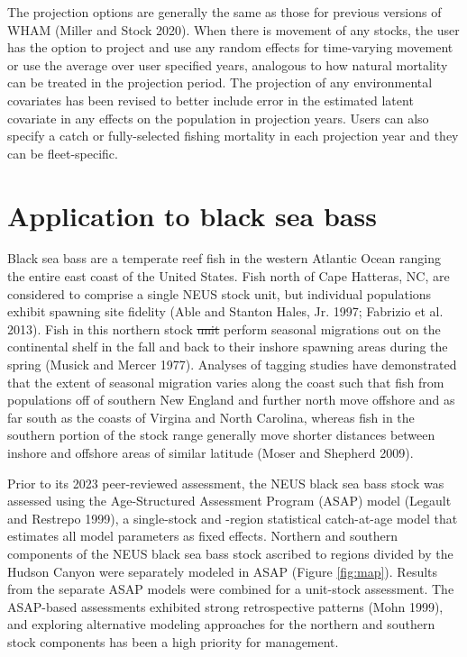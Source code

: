 \documentclass[
]{article}
\makeatletter
\providecommand{\DIFaddtex}[1]{{\protect\color{blue}\uwave{#1}}} %
\providecommand{\DIFdeltex}[1]{{\protect\color{red}\sout{#1}}} %
\providecommand{\DIFaddbegin}{} %
\providecommand{\DIFaddend}{} %
\providecommand{\DIFdelbegin}{} %
\providecommand{\DIFdelend}{} %
\providecommand{\DIFadd}[1]{\texorpdfstring{\DIFaddtex{#1}}{#1}} %
\providecommand{\DIFdel}[1]{\texorpdfstring{\DIFdeltex{#1}}{}} %
\newcommand{\DIFscaledelfig}{0.5}
\newlength{\DIFdelgraphicswidth} %
\newlength{\DIFdelgraphicsheight} %
\newcommand{\DIFaddincludegraphics}[2][]{{\color{blue}\fbox{\DIFOincludegraphics[#1]{#2}}}} %
\newcommand{\DIFdelincludegraphics}[2][]{%
\sbox{\DIFdelgraphicsbox}{\DIFOincludegraphics[#1]{#2}}%
\settoboxwidth{\DIFdelgraphicswidth}{\DIFdelgraphicsbox} %
\settoboxtotalheight{\DIFdelgraphicsheight}{\DIFdelgraphicsbox} %
\scalebox{\DIFscaledelfig}{%
\parbox[b]{\DIFdelgraphicswidth}{\usebox{\DIFdelgraphicsbox}\\[-\baselineskip] \rule{\DIFdelgraphicswidth}{0em}}\llap{\resizebox{\DIFdelgraphicswidth}{\DIFdelgraphicsheight}{%
\setlength{\unitlength}{\DIFdelgraphicswidth}%
\begin{picture}(1,1)%
\thicklines\linethickness{2pt} %
{\color[rgb]{1,0,0}\put(0,0){\framebox(1,1){}}}%
{\color[rgb]{1,0,0}\put(0,0){\line( 1,1){1}}}%
{\color[rgb]{1,0,0}\put(0,1){\line(1,-1){1}}}%
\end{picture}%
}\hspace*{3pt}}} %
} %
\DeclareRobustCommand{\DIFaddbegin}{\DIFOaddbegin \let\includegraphics\DIFaddincludegraphics} %
\DeclareRobustCommand{\DIFaddend}{\DIFOaddend \let\includegraphics\DIFOincludegraphics} %
\DeclareRobustCommand{\DIFdelbegin}{\DIFOdelbegin \let\includegraphics\DIFdelincludegraphics} %
\DeclareRobustCommand{\DIFdelend}{\DIFOaddend \let\includegraphics\DIFOincludegraphics} %
\let\sout@orig\sout %
\renewcommand{\sout}[1]{\ifmmode\text{\sout@orig{\ensuremath{#1}}}\else\sout@orig{#1}\fi} %
\makeatother
\begin{document}
The projection options are generally the same as those for previous versions of WHAM (Miller and Stock 2020). When there is movement of any stocks, the user has the option to project and use any random effects for time-varying movement or use the average over user specified years, analogous to how natural mortality can be treated in the projection period. The projection of any environmental covariates has been revised to better include error in the estimated latent covariate in any effects on the population in projection years. Users can also specify a catch or fully-selected fishing mortality in each projection year and they can be fleet-specific.

\hypertarget{application-to-black-sea-bass}{%
\section*{Application to black sea bass}\label{application-to-black-sea-bass}}

Black sea bass are a temperate reef fish in the western Atlantic Ocean ranging the entire east coast of the United States. Fish north of Cape Hatteras, NC, are considered to comprise a single NEUS stock unit, but individual populations exhibit spawning site fidelity (Able and Stanton Hales, Jr. 1997; Fabrizio et al. 2013). Fish in this northern stock \DIFdelbegin \DIFdel{unit }\DIFdelend \DIFaddbegin \DIFadd{component }\DIFaddend perform seasonal migrations out on the continental shelf in the fall and back to their inshore spawning areas during the spring (Musick and Mercer 1977). Analyses of tagging studies have demonstrated that the extent of seasonal migration varies along the coast such that fish from populations off of southern New England and further north move offshore and as far south as the coasts of Virgina and North Carolina, whereas fish in the southern portion of the stock range generally move shorter distances between inshore and offshore areas of similar latitude (Moser and Shepherd 2009).

Prior to its 2023 peer-reviewed assessment, the NEUS black sea bass stock was assessed using the Age-Structured Assessment Program (ASAP) model (Legault and Restrepo 1999), a single-stock and -region statistical catch-at-age model that estimates all model parameters as fixed effects. Northern and southern components of the NEUS black sea bass stock ascribed to regions divided by the Hudson Canyon were separately modeled in ASAP (Figure \ref{fig:map}). Results from the separate ASAP models were combined for a unit-stock assessment. The ASAP-based assessments exhibited strong retrospective patterns (Mohn 1999), and exploring alternative modeling approaches for the northern and southern stock components has been a high priority for management.
\end{document}
